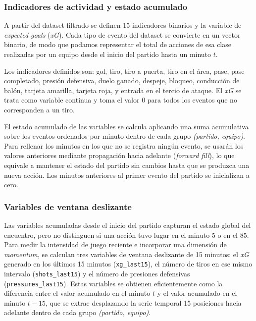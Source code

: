 \subsubsection{Indicadores de actividad y estado acumulado}

A partir del dataset filtrado se definen 15 indicadores binarios y la variable de \textit{expected goals} (\textit{xG}). Cada tipo de evento del dataset se convierte en un vector binario, de modo que podamos representar el total de acciones de esa clase realizadas por un equipo desde el inicio del partido hasta un minuto $t$.

Los indicadores definidos son: gol, tiro, tiro a puerta, tiro en el área, pase, pase completado, presión defensiva, duelo ganado, despeje, bloqueo, conducción de balón, tarjeta amarilla, tarjeta roja, y entrada en el tercio de ataque. El \textit{xG} se trata como variable continua y toma el valor 0 para todos los eventos que no corresponden a un tiro.

El estado acumulado de las variables se calcula aplicando una suma acumulativa sobre los eventos ordenados por minuto dentro de cada grupo \textit{(partido, equipo)}. Para rellenar los minutos en los que no se registra ningún evento, se usarán los valores anteriores mediante propagación hacia adelante (\textit{forward fill}), lo que equivale a mantener el estado del partido sin cambios hasta que se produzca una nueva acción. Los minutos anteriores al primer evento del partido se inicializan a cero.

\subsubsection{Variables de ventana deslizante}

Las variables acumuladas desde el inicio del partido capturan el estado global del encuentro, pero no distinguen si una acción tuvo lugar en el minuto 5 o en el 85. Para medir la intensidad de juego reciente e incorporar una dimensión de \textit{momentum}, se calculan tres variables de ventana deslizante de 15 minutos: el \textit{xG} generado en los últimos 15 minutos (\texttt{xg\_last15}), el número de tiros en ese mismo intervalo (\texttt{shots\_last15}) y el número de presiones defensivas (\texttt{pressures\_last15}). Estas variables se obtienen eficientemente como la diferencia entre el valor acumulado en el minuto $t$ y el valor acumulado en el minuto $t - 15$, que se extrae desplazando la serie temporal 15 posiciones hacia adelante dentro de cada grupo \textit{(partido, equipo)}.

